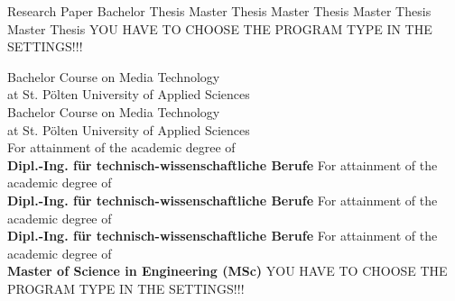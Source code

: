 \begin{center}

\vspace{1cm}

\begin{minipage}[t][5cm][s]{\textwidth}%
\centering
\Huge{{\color{FH2}{\fontsize{24}{30} \selectfont \workTitle\\}}}
\vspace{0.5cm}
\LARGE{{\color{FH2}{\fontsize{16}{24} \selectfont \subTitle\\}}}
\end{minipage}

\vspace{1cm}

\ifuseBachelorMediaTechnologiesOne
	\LARGE{Research Paper}
\else
	\ifuseBachelorMediaTechnologiesTwo
		\LARGE{Bachelor Thesis}
\else
	\ifuseMasterInteractiveTechnologies
		\LARGE{Master Thesis}
\else
	\ifuseMasterDigitalDesign
		\LARGE{Master Thesis}
\else
    \ifuseMasterDigitalMediaProduction
		\LARGE{Master Thesis}
\else
	\ifuseMasterDigitalHealthCare
		\LARGE{Master Thesis}
    \else
        \LARGE{YOU HAVE TO CHOOSE THE PROGRAM TYPE IN THE SETTINGS!!!}
  	\fi
\fi
\fi
\fi\fi\fi
  
\vspace{1.3cm}
\ifuseBachelorMediaTechnologiesOne
	\fontsize{11pt}{15pt}\selectfont Bachelor Course on Media Technology\\
at St. Pölten University of Applied Sciences\\  
\else
	\ifuseBachelorMediaTechnologiesTwo
		\fontsize{11pt}{15pt}\selectfont Bachelor Course on Media Technology\\
at St. Pölten University of Applied Sciences\\  
\else
	\ifuseMasterInteractiveTechnologies
		\fontsize{11pt}{15pt}\selectfont For attainment of the academic degree of\\
		\textbf{Dipl.-Ing. für technisch-wissenschaftliche Berufe}
\else
    \ifuseMasterDigitalDesign
		\fontsize{11pt}{15pt}\selectfont For attainment of the academic degree of\\
		\textbf{Dipl.-Ing. für technisch-wissenschaftliche Berufe}
\else
    \ifuseMasterDigitalMediaProduction
		\fontsize{11pt}{15pt}\selectfont For attainment of the academic degree of\\
		\textbf{Dipl.-Ing. für technisch-wissenschaftliche Berufe}
\else
	\ifuseMasterDigitalHealthCare
    	\fontsize{11pt}{15pt}\selectfont For attainment of the academic degree of\\
		\textbf{Master of Science in Engineering (MSc)}
    \else
        \LARGE{YOU HAVE TO CHOOSE THE PROGRAM TYPE IN THE SETTINGS!!!}
  	\fi
\fi
\fi
\fi\fi\fi


\end{center}
